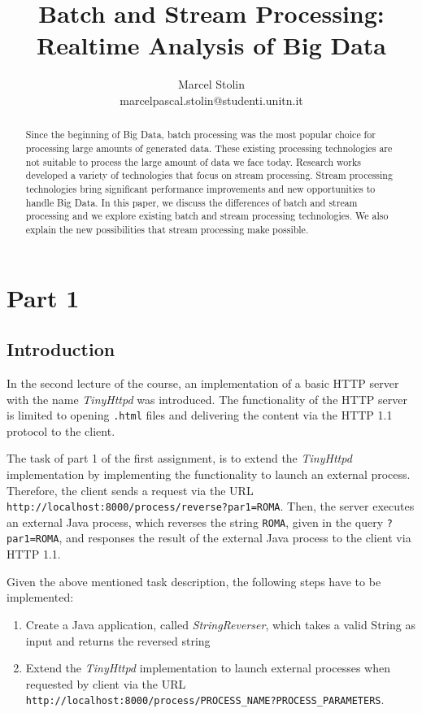 \documentclass{article}
\title{Batch and Stream Processing: Realtime Analysis of Big Data}
\date{}
\author{Marcel Stolin \\ marcelpascal.stolin@studenti.unitn.it}
\begin{document}
\maketitle


\begin{abstract}
Since the beginning of Big Data, batch processing was the most popular choice for processing large amounts of generated data. These existing processing technologies are not suitable to process the large amount of data we face today. Research works developed a variety of technologies that focus on stream processing. Stream processing technologies bring significant performance improvements and new opportunities to handle Big Data. In this paper, we discuss the differences of batch and stream processing and we explore existing batch and stream processing technologies. We also explain the new possibilities that stream processing make possible.
\end{abstract}

\section{Part 1}\label{sec:01_part1}

\subsection{Introduction}\label{subsec:01_part1_intro}
In the second lecture of the course, an implementation of a basic HTTP server with the name \textit{TinyHttpd} was introduced.
The functionality of the HTTP server is limited to opening \texttt{.html} files and delivering the content via the HTTP 1.1 protocol to the client.


The task of part 1 of the first assignment, is to extend the \textit{TinyHttpd} implementation by implementing the functionality to launch an external process. Therefore, the client sends a request via the URL \texttt{http://localhost:8000/process/reverse?par1=ROMA}. Then, the server executes an external Java process, which reverses the string \texttt{ROMA}, given in the query \texttt{?par1=ROMA}, and responses the result of the external Java process to the client via HTTP 1.1.


Given the above mentioned task description, the following steps have to be implemented:
\begin{enumerate}
\item Create a Java application, called \textit{StringReverser}, which takes a valid String as input and returns the reversed string
\item Extend the \textit{TinyHttpd} implementation to launch external processes when requested by client via the URL \texttt{http://localhost:8000/process/PROCESS\_NAME?PROCESS\_PARAMETERS}.
\end{enumerate}
\end{document}
